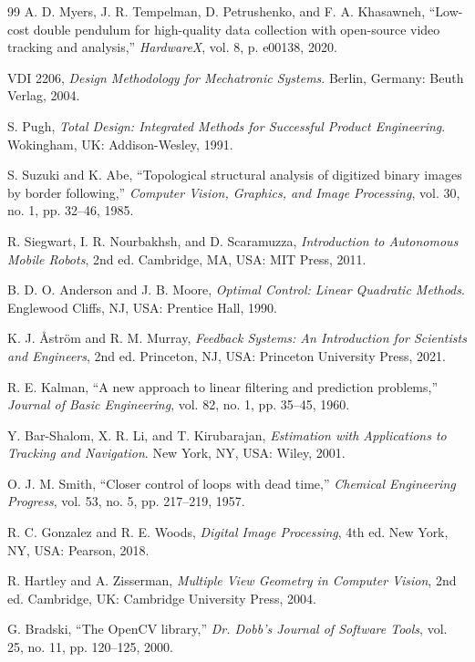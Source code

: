 \documentclass[11pt,letterpaper]{article}
\begin{document}
\begin{thebibliography}{99}
A. D. Myers, J. R. Tempelman, D. Petrushenko, and F. A. Khasawneh,
``Low-cost double pendulum for high-quality data collection with
open-source video tracking and analysis,''
\textit{HardwareX}, vol. 8, p. e00138, 2020.

VDI 2206, \textit{Design Methodology for Mechatronic Systems}.
Berlin, Germany: Beuth Verlag, 2004.

S. Pugh,
\textit{Total Design: Integrated Methods for Successful Product Engineering}.
Wokingham, UK: Addison-Wesley, 1991.

S. Suzuki and K. Abe,
``Topological structural analysis of digitized binary images by border
following,'' \textit{Computer Vision, Graphics, and Image Processing},
vol. 30, no. 1, pp. 32--46, 1985.

R. Siegwart, I. R. Nourbakhsh, and D. Scaramuzza,
\textit{Introduction to Autonomous Mobile Robots}, 2nd ed.
Cambridge, MA, USA: MIT Press, 2011.

B. D. O. Anderson and J. B. Moore,
\textit{Optimal Control: Linear Quadratic Methods}.
Englewood Cliffs, NJ, USA: Prentice Hall, 1990.

K. J. \AA str\"om and R. M. Murray,
\textit{Feedback Systems: An Introduction for Scientists and Engineers},
2nd ed. Princeton, NJ, USA: Princeton University Press, 2021.

R. E. Kalman,
``A new approach to linear filtering and prediction problems,''
\textit{Journal of Basic Engineering}, vol. 82, no. 1, pp. 35--45, 1960.

Y. Bar-Shalom, X. R. Li, and T. Kirubarajan,
\textit{Estimation with Applications to Tracking and Navigation}.
New York, NY, USA: Wiley, 2001.

O. J. M. Smith,
``Closer control of loops with dead time,''
\textit{Chemical Engineering Progress}, vol. 53, no. 5, pp. 217--219, 1957.

R. C. Gonzalez and R. E. Woods,
\textit{Digital Image Processing}, 4th ed. New York, NY, USA: Pearson, 2018.

R. Hartley and A. Zisserman,
\textit{Multiple View Geometry in Computer Vision}, 2nd ed.
Cambridge, UK: Cambridge University Press, 2004.

G. Bradski,
``The OpenCV library,''
\textit{Dr. Dobb's Journal of Software Tools}, vol. 25, no. 11,
pp. 120--125, 2000.


\end{thebibliography}
\end{document}
